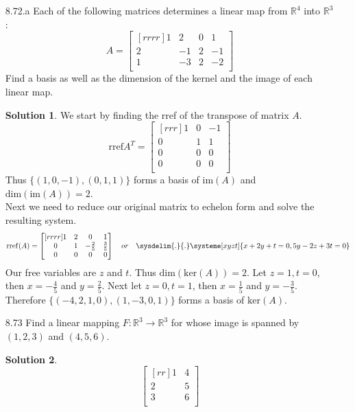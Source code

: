 \documentclass[12pt]{article}
\theoremstyle{definition}
\newtheorem*{solution}{Solution} %
\theoremstyle{plain}
\begin{document}
\begin{enumerate}
\item[8.72.a] Each of the following matrices determines a linear map from $\mathbb{R}^4$ into $\mathbb{R}^3$:
	\[ A=\begin{bmatrix}[rrrr]1&2&0&1\\2&-1&2&-1\\1&-3&2&-2\\\end{bmatrix} \]
	Find a basis as well as the dimension of the kernel and the image of each linear map.\\
	\begin{solution}
	We start by finding the rref of the transpose of matrix $A$.
	\[ \mathrm{rref}A^T = \begin{bmatrix}[rrr]1&0&-1\\0&1&1\\0&0&0\\0&0&0\\\end{bmatrix} \]
	Thus $\{(1,0,-1),(0,1,1)\}$ forms a basis of $\mathrm{im}(A)$ and $\mathrm{dim}(\mathrm{im}(A))=2$.\\
	Next we need to reduce our original matrix to echelon form and solve the resulting system.
	\[ \mathrm{rref}(A)=\begin{bmatrix}[rrrr]1&2&0&1\\0&1&-\frac{2}{5}&\frac{3}{5}\\0&0&0&0\\\end{bmatrix} \quad or \quad \sysdelim{.}{.}\systeme[xyzt]{x+2y+t=0,5y-2z+3t=0} \]
	Our free variables are $z$ and $t$. Thus $\mathrm{dim}(\mathrm{ker}(A))=2$. Let $z=1,t=0$, then $x=-\frac{4}{5}$ and $y=\frac{2}{5}$. Next let $z=0,t=1$, then $x=\frac{1}{5}$ and $y=-\frac{3}{5}$.\\
	Therefore $\{(-4,2,1,0),(1,-3,0,1)\}$ forms a basis of $\mathrm{ker}(A)$.
	\end{solution}

\item[8.73] Find a linear mapping $F:\mathbb{R}^3\rightarrow\mathbb{R}^3$ for whose image is spanned by $(1,2,3)$ and $(4,5,6)$.
	\begin{solution}
	\[ \begin{bmatrix}[rr]1&4\\2&5\\3&6\\\end{bmatrix} \]
	\end{solution}


\end{enumerate}
\end{document}
